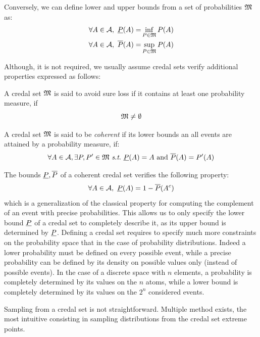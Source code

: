 Conversely, we can define lower and upper bounds from a set of probabilities ${\mathfrak{M}}$ as:
\begin{align*}
    \forall A\in\mathcal{A},~{\underline{P}}(A) =& \inf_{P\in{\mathfrak{M}}}P(A)\\
    \forall A\in\mathcal{A},~\overline{P}(A) =& \sup_{P\in{\mathfrak{M}}}P(A)
\end{align*}

Although, it is not required, we usually assume credal sets verify additional properties expressed as follows:
\begin{definition}
    A credal set ${\mathfrak{M}}$ is said to avoid sure loss if it contains at least one probability measure, \ie if
    \begin{equation}
        {\mathfrak{M}} \neq \emptyset\label{eq:avoid_sure_loss}
    \end{equation}
    
    A credal set ${\mathfrak{M}}$ is said to be \textit{coherent} if its lower bounds an all events are attained by a probability measure, \ie if:
    \begin{equation}
        \forall A\in\mathcal{A}, \exists P, P'\in\M~\st~\low(A)=A \text{ and } \overline{P}(A)=P'(A) 
    \end{equation}
\end{definition}
The bounds ${\underline{P}}, \overline{P}$ of a coherent credal set verifies the following property:
\begin{equation}
    \forall A\in\mathcal{A}, ~{\underline{P}}(A) = 1 - \overline{P}(A^c)\label{eq:lower_proba_complement}
\end{equation}
which is a generalization of the classical property for computing the complement of an event with precise probabilities. This allows us to only specify the lower bound ${\underline{P}}$ of a credal set to completely describe it, as its upper bound is determined by ${\underline{P}}$. Defining a credal set requires to specify much more constraints on the probability space that in the case of probability distributions. Indeed a lower probability must be defined on every possible event, while a precise probability can be defined by its density on possible values only (instead of possible events). In the case of a discrete space with $n$ elements, a probability is completely determined by its values on the $n$ atoms, while a lower bound is completely determined by its values on the $2^n$ considered events.


\begin{remark}
    Sampling from a credal set is not straightforward. Multiple method exists, the most intuitive consisting in sampling distributions from the credal set extreme points.
\end{remark}

